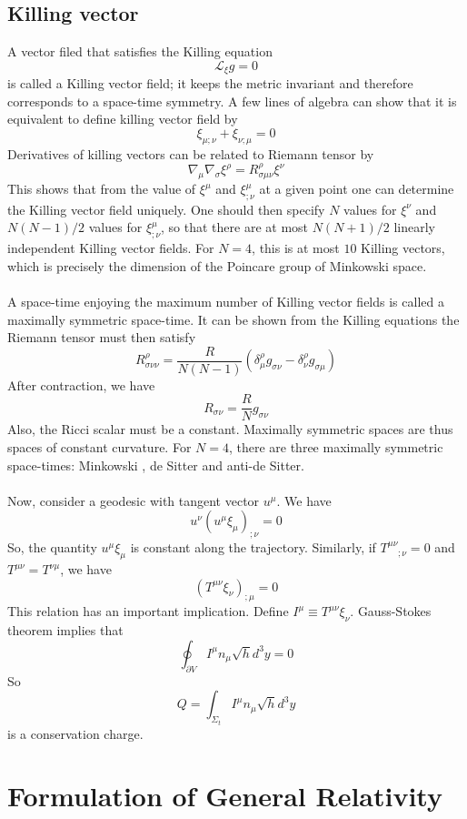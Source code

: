 \section{Killing vector}
A vector filed that satisfies the Killing equation
\[\mathcal{L}_{\xi}g = 0\]
is called a Killing vector field; it keeps the metric invariant and therefore corresponds to a space-time symmetry. A few lines of algebra can show that it is equivalent to define killing vector field by
\[\xi_{\mu;\nu} + \xi_{\nu;\mu} = 0\]
Derivatives of killing vectors can be related to Riemann tensor by
\[\nabla_{\mu} \nabla_{\sigma}\xi^{\rho} = R^{\rho}_{\sigma\mu\nu}\xi^{\nu}\]
This shows that from the value of $\xi^{\mu}$ and $\xi^{\mu}_{;\nu}$ at a given point one can determine the Killing vector field uniquely. One should then specify $N$ values for $\xi^{\nu}$ and $N(N-1)/2$ values for $\xi^{\mu}_{;\nu}$, so that there are at most $N(N+1)/2$ linearly independent Killing vector fields. For $N=4$,
this is at most $10$ Killing vectors, which is precisely the dimension of the Poincare group of Minkowski space.
\\ \\
A space-time enjoying the maximum number of Killing vector fields is called a maximally symmetric space-time. It can be shown from the Killing equations the Riemann tensor must then satisfy
\[R^{\rho}_{\sigma\nu\nu} = \frac{R}{N(N-1)} (\delta^{\rho}_{\mu}g_{\sigma\nu} - \delta^{\rho}_{\nu}g_{\sigma\mu})\]
After contraction, we have
\[R_{\sigma\nu} = \frac{R}{N}g_{\sigma\nu}\]
Also, the Ricci scalar must be a constant. Maximally symmetric spaces are thus spaces of constant curvature. 
For $N =4$, there are three maximally symmetric space-times:
Minkowski , de Sitter and anti-de Sitter.
\\ \\
Now, consider a geodesic with tangent vector $u^{\mu}$. We have
\[u^{\nu}(u^{\mu}\xi_{\mu})_{;\nu} = 0\]
So, the quantity $u^{\mu}\xi_{\mu}$ is constant along the trajectory.
Similarly, if $T^{\mu\nu}_{\phantom{xx} ;\nu} = 0$ and $T^{\mu\nu}=T^{\nu\mu}$, we have
\[(T^{\mu\nu}\xi_{\nu})_{;\mu} = 0\]
This relation has an important implication. Define $I^{\mu} \equiv T^{\mu\nu}\xi_{\nu}$. Gauss-Stokes theorem implies that
\[\oint_{\partial V} I^{\mu}n_{\mu} \sqrt{h}d^3y = 0\]
So
\[Q = \int_{\Sigma_t} I^{\mu}n_{\mu} \sqrt{h}d^3y\]
is a conservation charge.

\chapter{Formulation of General Relativity}
